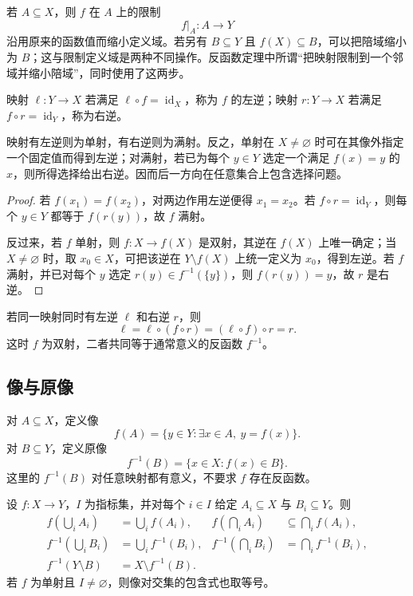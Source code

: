 若 \(A\subseteq X\)，则 \(f\) 在 \(A\) 上的限制
\[
  f|_A:A\to Y
\]
沿用原来的函数值而缩小定义域。若另有 \(B\subseteq Y\) 且 \(f(X)\subseteq B\)，可以把陪域缩小为 \(B\)；这与限制定义域是两种不同操作。反函数定理中所谓“把映射限制到一个邻域并缩小陪域”，同时使用了这两步。

映射 \(\ell:Y\to X\) 若满足 \(\ell\circ f=\operatorname{id}_X\)，称为 \(f\) 的左逆；映射 \(r:Y\to X\) 若满足 \(f\circ r=\operatorname{id}_Y\)，称为右逆。

\begin{proposition}[单射、满射与单侧逆]
映射有左逆则为单射，有右逆则为满射。反之，单射在 \(X\ne\varnothing\) 时可在其像外指定一个固定值而得到左逆；对满射，若已为每个 \(y\in Y\) 选定一个满足 \(f(x)=y\) 的 \(x\)，则所得选择给出右逆。因而后一方向在任意集合上包含选择问题。
\end{proposition}

\begin{proof}
若 \(f(x_1)=f(x_2)\)，对两边作用左逆便得 \(x_1=x_2\)。若 \(f\circ r=\operatorname{id}_Y\)，则每个 \(y\in Y\) 都等于 \(f(r(y))\)，故 \(f\) 满射。

反过来，若 \(f\) 单射，则 \(f:X\to f(X)\) 是双射，其逆在 \(f(X)\) 上唯一确定；当 \(X\ne\varnothing\) 时，取 \(x_0\in X\)，可把该逆在 \(Y\setminus f(X)\) 上统一定义为 \(x_0\)，得到左逆。若 \(f\) 满射，并已对每个 \(y\) 选定 \(r(y)\in f^{-1}(\{y\})\)，则 \(f(r(y))=y\)，故 \(r\) 是右逆。
\end{proof}

若同一映射同时有左逆 \(\ell\) 和右逆 \(r\)，则
\[
  \ell=\ell\circ(f\circ r)=(\ell\circ f)\circ r=r.
\]
这时 \(f\) 为双射，二者共同等于通常意义的反函数 \(f^{-1}\)。

\subsection{像与原像}

对 \(A\subseteq X\)，定义像
\[
  f(A)=\{y\in Y:\exists x\in A,\ y=f(x)\}.
\]
对 \(B\subseteq Y\)，定义原像
\[
  f^{-1}(B)=\{x\in X:f(x)\in B\}.
\]
这里的 \(f^{-1}(B)\) 对任意映射都有意义，不要求 \(f\) 存在反函数。

\begin{proposition}[像与原像的集合运算]
设 \(f:X\to Y\)，\(I\) 为指标集，并对每个 \(i\in I\) 给定 \(A_i\subseteq X\) 与 \(B_i\subseteq Y\)。则
\[
\begin{aligned}
 f\left(\bigcup_i A_i\right)&=\bigcup_i f(A_i),&
 f\left(\bigcap_i A_i\right)&\subseteq\bigcap_i f(A_i),\\
 f^{-1}\left(\bigcup_i B_i\right)&=\bigcup_i f^{-1}(B_i),&
 f^{-1}\left(\bigcap_i B_i\right)&=\bigcap_i f^{-1}(B_i),\\
 f^{-1}(Y\setminus B)&=X\setminus f^{-1}(B).
\end{aligned}
\]
若 \(f\) 为单射且 \(I\ne\varnothing\)，则像对交集的包含式也取等号。
\end{proposition}

